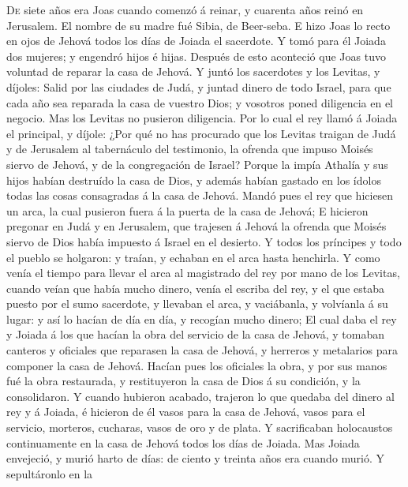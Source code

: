  \textsc{De} siete años era Joas cuando comenzó á reinar,
y cuarenta años reinó en Jerusalem. El nombre de su madre fué Sibia, de
Beer-seba.  E hizo Joas lo recto en ojos de Jehová todos
los días de Joiada el sacerdote.  Y tomó para él Joiada
dos mujeres; y engendró hijos é hijas.  Después de esto
aconteció que Joas tuvo voluntad de reparar la casa de Jehová.
 Y juntó los sacerdotes y los Levitas, y díjoles: Salid
por las ciudades de Judá, y juntad dinero de todo Israel, para que cada
año sea reparada la casa de vuestro Dios; y vosotros poned diligencia en
el negocio. Mas los Levitas no pusieron diligencia.  Por
lo cual el rey llamó á Joiada el principal, y díjole: ¿Por qué no has
procurado que los Levitas traigan de Judá y de Jerusalem al tabernáculo
del testimonio, la ofrenda que impuso Moisés siervo de Jehová, y de la
congregación de Israel?  Porque la impía Athalía y sus
hijos habían destruído la casa de Dios, y además habían gastado en los
ídolos todas las cosas consagradas á la casa de Jehová. 
Mandó pues el rey que hiciesen un arca, la cual pusieron fuera á la
puerta de la casa de Jehová;  E hicieron pregonar en Judá
y en Jerusalem, que trajesen á Jehová la ofrenda que Moisés siervo de
Dios había impuesto á Israel en el desierto.  Y todos los
príncipes y todo el pueblo se holgaron: y traían, y echaban en el arca
hasta henchirla.  Y como venía el tiempo para llevar el
arca al magistrado del rey por mano de los Levitas, cuando veían que
había mucho dinero, venía el escriba del rey, y el que estaba puesto por
el sumo sacerdote, y llevaban el arca, y vaciábanla, y volvíanla á su
lugar: y así lo hacían de día en día, y recogían mucho dinero;
 El cual daba el rey y Joiada á los que hacían la obra
del servicio de la casa de Jehová, y tomaban canteros y oficiales que
reparasen la casa de Jehová, y herreros y metalarios para componer la
casa de Jehová.  Hacían pues los oficiales la obra, y por
sus manos fué la obra restaurada, y restituyeron la casa de Dios á su
condición, y la consolidaron.  Y cuando hubieron acabado,
trajeron lo que quedaba del dinero al rey y á Joiada, é hicieron de él
vasos para la casa de Jehová, vasos para el servicio, morteros,
cucharas, vasos de oro y de plata. Y sacrificaban holocaustos
continuamente en la casa de Jehová todos los días de Joiada.
 Mas Joiada envejeció, y murió harto de días: de ciento y
treinta años era cuando murió.  Y sepultáronlo en la
